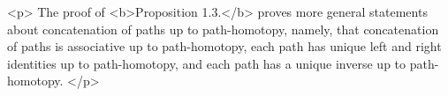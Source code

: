 <p>
    The proof of <b>Proposition 1.3.</b> proves more general statements about concatenation of paths up to path-homotopy, namely, 
    that concatenation of paths is associative up to path-homotopy, each path has unique left and right identities up to path-homotopy,
    and each path has a unique inverse up to path-homotopy.
</p>